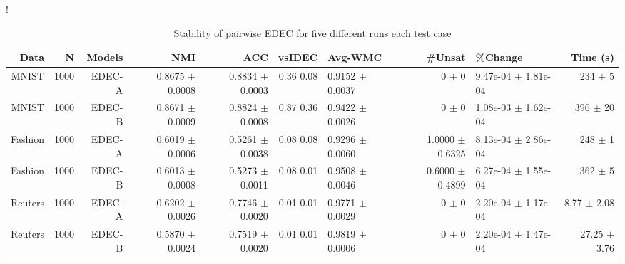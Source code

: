 \begin{table}[ht]
\caption{Stability of pairwise EDEC for five different runs each test case}\label{tab:pw-stability}
\resizebox{\columnwidth}!{
\begin{tabular}{ | r | r | r | r | r | r | H  r | H  r |}
\hline
Data & N & Models & NMI & ACC & vsIDEC & Avg-WMC & \#Unsat & \%Change & Time (s)  \\ \hline 
MNIST & 1000 & EDEC-A & { \color{green} 0.8675 $\pm$ 0.0008} & { \color{green} 0.8834 $\pm$ 0.0003} & { \color{green} 0.36} { \color{green} 0.08} & 0.9152 $\pm$ 0.0037 & 0 $\pm$ 0 & 9.47e-04 $\pm$ 1.81e-04 & 234 $\pm$ 5 \\ 
MNIST & 1000 & EDEC-B & { \color{blue} 0.8671 $\pm$ 0.0009} & { \color{blue} 0.8824 $\pm$ 0.0008} & { \color{green} 0.87} { \color{green} 0.36} & 0.9422 $\pm$ 0.0026 & 0 $\pm$ 0 & 1.08e-03 $\pm$ 1.62e-04 & 396 $\pm$ 20 \\ \hline 
Fashion & 1000 & EDEC-A & { \color{green} 0.6019 $\pm$ 0.0006} & { \color{blue} 0.5261 $\pm$ 0.0038} & { \color{green} 0.08} { \color{green} 0.08} & 0.9296 $\pm$ 0.0060 & 1.0000 $\pm$ 0.6325 & 8.13e-04 $\pm$ 2.86e-04 & 248 $\pm$ 1 \\ 
Fashion & 1000 & EDEC-B & { \color{blue} 0.6013 $\pm$ 0.0008} & { \color{green} 0.5273 $\pm$ 0.0011} & { \color{green} 0.08} { \color{green} 0.01} & 0.9508 $\pm$ 0.0046 & 0.6000 $\pm$ 0.4899 & 6.27e-04 $\pm$ 1.55e-04 & 362 $\pm$ 5 \\ \hline 
Reuters & 1000 & EDEC-A & { \color{green} 0.6202 $\pm$ 0.0026} & { \color{green} 0.7746 $\pm$ 0.0020} & { \color{green} 0.01} { \color{green} 0.01} & 0.9771 $\pm$ 0.0029 & 0 $\pm$ 0 & 2.20e-04 $\pm$ 1.17e-04 & 8.77 $\pm$ 2.08 \\ 
Reuters & 1000 & EDEC-B & 0.5870 $\pm$ 0.0024 & 0.7519 $\pm$ 0.0020 & { \color{green} 0.01} { \color{green} 0.01} & 0.9819 $\pm$ 0.0006 & 0 $\pm$ 0 & 2.20e-04 $\pm$ 1.47e-04 & 27.25 $\pm$ 3.76 \\ 
\hline
\end{tabular}
}
\end{table}